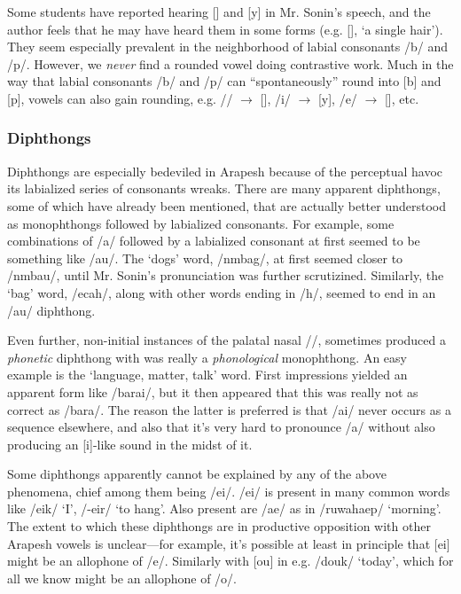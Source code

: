 \documentclass[pdftex,12pt,letterpaper]{article}
\let\ipa\textipa
\def\sw{\ipa{\super w}}
\begin{document}
 Some students have reported hearing [\ipa{\o}] and [y] in Mr. Sonin's speech, and the author feels that he may have heard them in some forms (e.g. [\ipa{atub\o r ehib\o r}], `a single hair'). They seem especially prevalent in the neighborhood of labial consonants /b/ and /p/. However, we \emph{never} find a rounded vowel doing contrastive work. Much in the way that labial consonants /b/ and /p/ can ``spontaneously'' round into [b\sw] and [p\sw], vowels can also gain rounding, e.g. /\ipa{1}/ $\rightarrow$ [\ipa{0}], /i/ $\rightarrow$ [y], /e/ $\rightarrow$ [\ipa{\o}], etc.

 \subsubsection{Diphthongs} 
 
 Diphthongs are especially bedeviled in Arapesh because of the perceptual havoc its labialized series of consonants wreaks. There are many apparent diphthongs, some of which have already been mentioned, that are actually better understood as monophthongs followed by labialized consonants. For example, some combinations of /a/ followed by a labialized consonant at first seemed to be something like /au/. The `dogs' word, /n\ipa{1}mbag\sw/, at first seemed closer to /n\ipa{1}mbau/, until Mr. Sonin's pronunciation was further scrutizined. Similarly, the `bag' word, /ecah\sw/, along with other words ending in /h\sw/, seemed to end in an /au/ diphthong. 
 
 Even further, non-initial instances of the palatal nasal /\ipa{\textltailn}/, sometimes produced a \emph{phonetic} diphthong with was really a \emph{phonological} monophthong. An easy example is the `language, matter, talk' word. First impressions yielded an apparent form like /barai\ipa{\textltailn}/, but it then appeared that this was really not as correct as /bara\ipa{\textltailn}/. The reason the latter is preferred is that /ai/ never occurs as a sequence elsewhere, and also that it's very hard to pronounce /a\ipa{\textltailn}/ without also producing an [i]-like sound in the midst of it.
 
 Some diphthongs apparently cannot be explained by any of the above phenomena, chief among them being /ei/. /ei/ is present in many common words like /eik/ `I', /-eir/ `to hang'. Also present are /ae/ as in /ruwahaep/ `morning'. The extent to which these diphthongs are in productive opposition with other Arapesh vowels is unclear---for example, it's possible at least in principle that [ei] might be an allophone of /e/. Similarly with [ou] in e.g. /douk/ `today', which for all we know might be an allophone of /o/.
\end{document}
